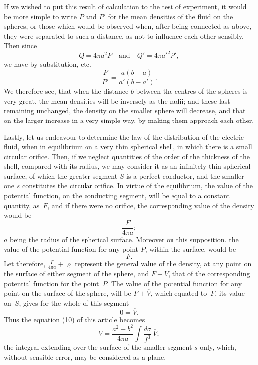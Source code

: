 \documentclass[12pt,notitlepage]{amsart}
\renewcommand{\rho}{\varrho}
\begin{document}
If we wished to put this result of calculation to the test of experiment,
it would be more simple to write $P$ and $P'$ for the mean densities of the
fluid on the spheres, or those which would be observed when, after being
connected as above, they were separated to such a distance, as not to influence
each other sensibly. Then since
\[
Q=4\pi a^2P \quad\text{and}\quad Q'=4\pi a'^2P',
\]
we have by substitution, etc.
\[
\frac{P}{P'}=\frac{a(b-a)}{a'(b-a')}.
\]
We therefore see, that when the distance $b$ between the centres of the spheres
is very great, the mean densities will be inversely as the radii; and these
last remaining unchanged, the density on the smaller sphere will decrease,
and that on the larger increase in a very simple way, by making them approach
each other.

Lastly, let us endeavour to determine the law of the distribution of
the electric fluid, when in equilibrium on a very thin spherical shell, in which
there is a small circular orifice. Then, if we neglect quantities of the order
of the thickness of the shell, compared with its radius, we may consider it
as an infinitely thin spherical surface, of which the greater segment $S$ is a
perfect conductor, and the smaller one $s$ constitutes the circular orifice. In
virtue of the equilibrium,
the value of the potential function, on the conducting
segment, will be equal to a constant quantity, as~$F$, and if there were no
orifice, the corresponding value of the density would be
\[
\frac{F}{4\pi a};
\]
$a$ being the radius of the spherical surface, Moreover on this supposition,
the value of the potential function for any point $P$,
within the surface, would be
\[
F.
\]
Let therefore, $\frac{F}{4\pi a}+\rho$ represent
the general value of the density, at any point
on the surface of either segment of the sphere,
and $F+V$, that of the corresponding
potential function for the point~$P$. The value of the potential
function for any point on the surface of the sphere,
will be ${F+\overline{V}}$, which
equated to~$F$, its value on~$S$, gives for the whole of this segment
\[
0=\overline{V}.
\]
Thus the equation (10) of this article becomes
\[
V=\frac{a^2-b^2}{4\pi a}\int\frac{d\sigma}{f^3}\,\overline{V};
\]
the integral extending over the surface of the smaller segment $s$ only, which,
without sensible error, may be considered as a plane.
\end{document}
